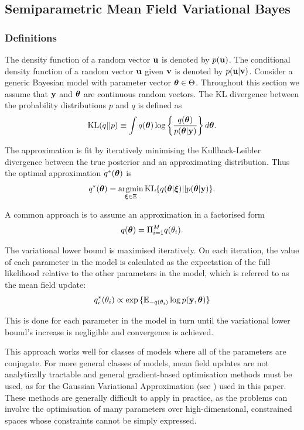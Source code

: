 \documentclass{amsart}[12pt]
\begin{document}

\subsection{Semiparametric Mean Field Variational Bayes}

\subsubsection{Definitions}

The density function of a random vector ${\bf u}$ is denoted by $p({\bf u})$.  The conditional density function of a
random vector ${\bf u}$ given ${\bf v}$ is denoted by $p({\bf u}|{\bf v})$. Consider a generic Bayesian model with parameter
vector ${\boldsymbol \theta} \in \Theta$. Throughout this section we assume that ${\bf y}$ and ${\boldsymbol \theta}$ are continuous random
vectors. The KL divergence between the probability distributions $p$ and $q$ is defined as
$$
\text{KL}(q || p) \equiv \int q({\boldsymbol \theta}) \log \left \{ \frac{q({\boldsymbol \theta})}{p({\boldsymbol \theta} | {\bf y})} \right \} d {\boldsymbol \theta}.
$$

\noindent The approximation is fit by iteratively minimising the Kullback-Leibler divergence between the true
posterior and an approximating distribution. Thus the optimal approximation $q^*({\boldsymbol \theta})$ is
$$
q^*(\vtheta) = \argmin_{\vxi \in \Xi} \text{KL} \{ {q(\vtheta|\vxi) || p(\vtheta|\vy)} \}.
$$

\noindent A common approach is to assume an approximation in a factorised form
$$q({\boldsymbol \theta}) = \Pi_{i=1}^M q(\theta_i).$$

\noindent The variational lower bound is maximised iteratively. On each iteration, the value of each parameter
in the model is calculated as the expectation of the full likelihood relative to the other parameters in the
model, which is referred to as the mean field update:
$$q_i^*(\theta_i) \propto \exp{\{ {\mathbb E}_{-q(\theta_i)} \log p({\bf y}, {\boldsymbol\theta}) \}}$$

\noindent This is done for each parameter in the model in turn until the variational lower bound's increase is
negligible and convergence is achieved.

This approach works well for classes of models where all of the parameters are conjugate. For more
general classes of models, mean field updates are not analytically tractable and general gradient-based
optimisation methods must be used, as for the Gaussian Variational Approximation (see \citep{ormerod09}) used
in this paper. These methods are generally difficult to apply in practice, as the problems can involve the
optimisation of many parameters over high-dimensional, constrained spaces whose constraints cannot be simply
expressed.
\end{document}
